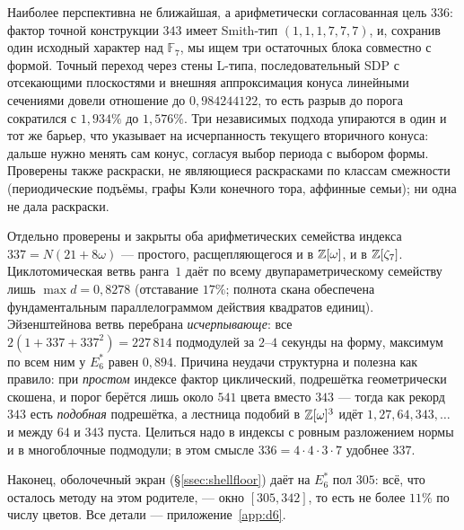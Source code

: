\begin{enumerate}[leftmargin=1.5em]
Наиболее перспективна не ближайшая, а арифметически согласованная цель $336$:
фактор точной конструкции $343$ имеет Smith-тип $(1,1,1,7,7,7)$, и, сохранив
один исходный характер над $\mathbb F_7$, мы ищем три остаточных блока
совместно с формой. Точный переход через стены L-типа, последовательный SDP с отсекающими плоскостями и внешняя аппроксимация конуса линейными сечениями довели
отношение до $0{,}984244122$, то есть разрыв до порога сократился с $1{,}934\%$
до $1{,}576\%$. Три независимых подхода упираются в один и тот же барьер, что
указывает на исчерпанность текущего вторичного конуса: дальше нужно менять сам
конус, согласуя выбор периода с выбором формы. Проверены также раскраски, не
являющиеся раскрасками по классам смежности (периодические подъёмы, графы Кэли
конечного тора, аффинные семьи); ни одна не дала раскраски.

Отдельно проверены и закрыты оба арифметических семейства индекса
$337=N(21+8\omega)$ --- простого, расщепляющегося и в $\mathbb{Z}[\omega]$, и в
$\mathbb{Z}[\zeta_7]$. Циклотомическая ветвь ранга~$1$ даёт по всему
двупараметрическому семейству лишь $\max d=0{,}8278$ (отставание $17\%$;
полнота скана обеспечена фундаментальным параллелограммом действия квадратов
единиц). Эйзенштейнова ветвь перебрана \emph{исчерпывающе}: все
$2(1+337+337^2)=227\,814$ подмодулей за $2$--$4$ секунды на форму, максимум по
всем ним у $E_6^*$ равен $0{,}894$. Причина неудачи структурна и полезна как
правило: при \emph{простом} индексе фактор циклический, подрешётка
геометрически скошена, и порог берётся лишь около $541$ цвета вместо $343$ ---
тогда как рекорд $343$ есть \emph{подобная} подрешётка, а лестница подобий в
$\mathbb{Z}[\omega]^3$ идёт $1,27,64,343,\dots$ и между $64$ и $343$ пуста. Целиться
надо в индексы с ровным разложением нормы и в многоблочные подмодули; в этом
смысле $336=4\cdot4\cdot3\cdot7$ удобнее $337$.

Наконец, оболочечный экран (\S\ref{ssec:shellfloor}) даёт на $E_6^*$ пол $305$:
всё, что осталось методу на этом родителе, --- окно $[305,342]$, то есть не
более $11\%$ по числу цветов. Все детали --- приложение~\ref{app:d6}.


\end{enumerate}
